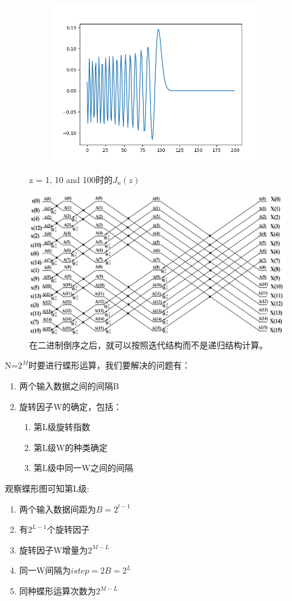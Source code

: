 \begin{figure}[h]
\begin{subfigure}{0.3\linewidth}
        \includegraphics[width=\linewidth]{figures/result100.png}
    \end{subfigure}
    \caption{z = 1, 10 and 100时的$J_n(z)$}
\end{figure}
\begin{figure}[h]
    \centering
    \includegraphics[width=\linewidth]{figures/4.jpg}
    \caption{在二进制倒序之后，就可以按照迭代结构而不是递归结构计算。}
\end{figure}
N=$2^M$时要进行蝶形运算，我们要解决的问题有：
\begin{enumerate}
    \item 两个输入数据之间的间隔B
    \item 旋转因子W的确定，包括：
    \begin{enumerate}
        \item 第L级旋转指数
        \item 第L级W的种类确定
        \item 第L级中同一W之间的间隔
    \end{enumerate}
\end{enumerate}
观察蝶形图可知第L级:
\begin{enumerate}
    \item 两个输入数据间距为$B=2^{l-1}$
    \item 有$2^{L-1}$个旋转因子
    \item 旋转因子W增量为$2^{M-L}$
    \item 同一W间隔为$istep=2B=2^L$
    \item 同种蝶形运算次数为$2^{M-L}$
\end{enumerate}
